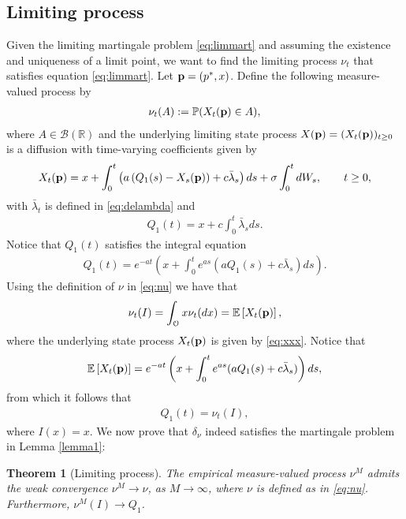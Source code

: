 \documentclass[10pt]{article}
\theoremstyle{plain}
\newtheorem{theorem}{Theorem}
\theoremstyle{definition}
\newcommand{\<}{\langle}
\renewcommand{\>}{\rangle}
\renewcommand{\(}{\left(}
\renewcommand{\)}{\right)}
\renewcommand{\[}{\left[}
\renewcommand{\]}{\right]}
\newcommand{\blu}[1]{\textcolor{blue}{#1}}
\begin{document}
\subsection{Limiting process}\label{sec43}
Given the limiting martingale problem \eqref{eq:limmart} and assuming the existence and uniqueness of a limit point, we want to find the limiting process $\nu_t$ that satisfies equation \eqref{eq:limmart}.  Let $\bold{p}=(p^*,x)$. Define the following measure-valued process by %
\begin{align}\label{eq:nu}
\nu_t(A):=\mathbb{P}(X_t(\bold{p})\in A),
\end{align}
where $A\in \mathcal{B}(\mathbb{R})$ and the underlying limiting state process
$X(\bold{p})=(X_t(\bold{p}))_{t\geq 0}$ is a diffusion with time-varying coefficients given by
\begin{align}\label{eq:xxx}
 X_t(\bold{p})=x+\int_0^t\left(a\left(Q_1(s)-X_s(\bold{p})\right)+c\bar\lambda_s\right)ds+\sigma \int_0^tdW_s, \qquad t\geq 0,
\end{align}
with $\bar\lambda_t$ is defined in \eqref{eq:delambda} and
\begin{align}\label{eq:Qexpr}
 Q_1(t)=x+c\int_0^t\bar\lambda_sds.
\end{align}
Notice that $Q_1(t)$ satisfies the integral equation %
\begin{align}\label{eq:Qdefine}
  Q_1(t)=e^{-at}\left(x+\int_0^t e^{as}\left(aQ_1(s)+c\bar\lambda_s\right)ds\right).
\end{align}
Using the definition of $\nu$ in \eqref{eq:nu} we have that
\begin{align}
\nu_t(I) = \int_\mathcal{O}x\nu_t(dx) = \mathbb{E}\left[X_t(\bold{p})\right],
\end{align}
where the underlying state process $X_{t}(\bold{p})$ is given by \eqref{eq:xxx}.
Notice that
\begin{align}
\mathbb{E}\left[X_t(\bold{p})\right]=e^{-at}\left(x+\int_0^te^{as}(aQ_1(s)+c\bar \lambda_s)\right)ds,
\end{align}
from which it follows that
\begin{align}\label{eq:defnuq}
Q_1(t)=\nu_t(I),
\end{align}
 where $I(x)= x$. We now prove that $\delta_\nu$ indeed satisfies the martingale problem in Lemma \ref{lemma1}:
\begin{theorem}[Limiting process]\label{theoremLimPro}
The empirical measure-valued process $\nu^M$ admits the weak convergence $\nu^M\rightarrow \nu$, as $M\rightarrow \infty$, where $\nu$ is defined as in \eqref{eq:nu}. 
Furthermore, $\nu^M(I)\rightarrow Q_1$.
\end{theorem}
\end{document}
